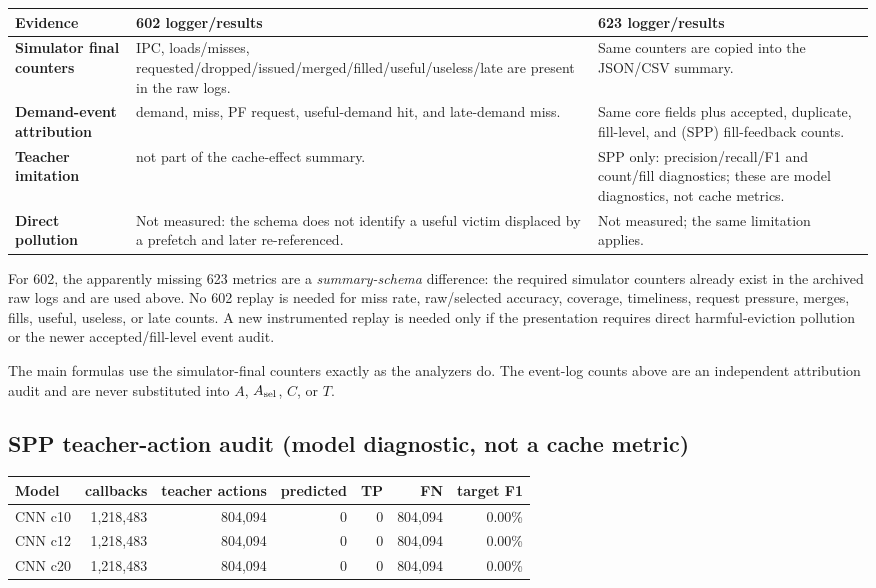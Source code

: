 \documentclass[10pt]{article}
\begin{document}
\begin{tabularx}{\textwidth}{@{}>{\bfseries}lXX@{}}
\toprule
Evidence & 602 logger/results & 623 logger/results \\
\midrule
Simulator final counters & IPC, loads/misses, requested/dropped/issued/merged/filled/useful/useless/late are present in the raw logs. & Same counters are copied into the JSON/CSV summary.\\
Demand-event attribution & demand, miss, PF request, useful-demand hit, and late-demand miss. & Same core fields plus accepted, duplicate, fill-level, and (SPP) fill-feedback counts.\\
Teacher imitation & not part of the cache-effect summary. & SPP only: precision/recall/F1 and count/fill diagnostics; these are model diagnostics, not cache metrics.\\
Direct pollution & Not measured: the schema does not identify a useful victim displaced by a prefetch and later re-referenced. & Not measured; the same limitation applies.\\
\bottomrule
\end{tabularx}

\begin{infobox}[title={\bfseries Replay decision}]
For 602, the apparently missing 623 metrics are a \emph{summary-schema}
difference: the required simulator counters already exist in the archived raw
logs and are used above.  No 602 replay is needed for miss rate, raw/selected
accuracy, coverage, timeliness, request pressure, merges, fills, useful,
useless, or late counts.  A new instrumented replay is needed only if the
presentation requires direct harmful-eviction pollution or the newer
accepted/fill-level event audit.
\end{infobox}

{\footnotesize The main formulas use the simulator-final counters exactly as
the analyzers do.  The event-log counts above are an independent attribution
audit and are never substituted into $A$, $A_{\rm sel}$, $C$, or $T$.}


\subsection*{SPP teacher-action audit (model diagnostic, not a cache metric)}
\begin{center}\small
\begin{tabular}{@{}lrrrrrr@{}}
\toprule
Model & callbacks & teacher actions & predicted & TP & FN & target F1 \\
\midrule
CNN c10 & 1,218,483 & 804,094 & 0 & 0 & 804,094 & 0.00\% \\
CNN c12 & 1,218,483 & 804,094 & 0 & 0 & 804,094 & 0.00\% \\
CNN c20 & 1,218,483 & 804,094 & 0 & 0 & 804,094 & 0.00\% \\
\bottomrule
\end{tabular}
\end{center}
\end{document}
